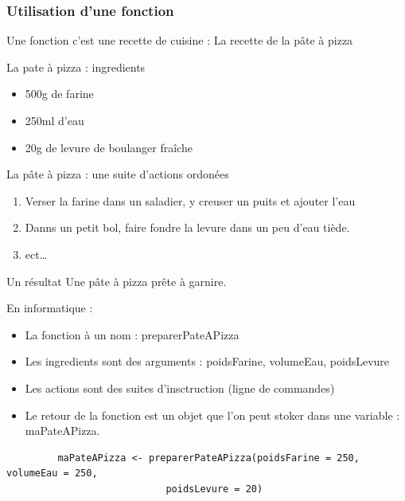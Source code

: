\documentclass[table,svgnames,hyperref={pdfpagemode=FullScreen}]{beamer}
\begin{document}
\begin{frame}
	\frametitle{Utilisation d'une fonction}
	Une fonction c'est une recette de cuisine : La recette de la pâte à pizza
	\begin{exampleblock}{La pate à pizza  : ingredients}
		\begin{itemize}
			\item 500g de farine
			\item 250ml d'eau
			\item 20g de levure de boulanger fraîche
		\end{itemize}
	\end{exampleblock}
\end{frame}
\begin{frame}
	\begin{exampleblock}{La pâte à pizza :  une suite d'actions ordonées}
		\begin{enumerate}
			\item Verser la farine dans un saladier, y creuser un puits et ajouter l'eau
			\item Danns un petit bol, faire fondre la levure dans un peu d'eau tiède.
			\item ect\dots
		\end{enumerate}
			
	\end{exampleblock}
\end{frame}
\begin{frame}
	\begin{exampleblock}{Un résultat}
		Une pâte à pizza prête à garnire.
	\end{exampleblock}
\end{frame}
\begin{frame}[fragile]
	\begin{exampleblock}{En informatique : }
		\begin{itemize}
			\item La fonction à un nom  : preparerPateAPizza
			\item Les ingredients sont des arguments : poidsFarine, volumeEau, poidsLevure
			\item Les actions sont des suites d'insctruction (ligne de commandes)
			\item Le retour de la fonction est un objet que l'on peut stoker dans une variable : maPateAPizza.
		\end{itemize}
		\begin{lstlisting}
		 maPateAPizza <- preparerPateAPizza(poidsFarine = 250, volumeEau = 250, 
							poidsLevure = 20) 
		 \end{lstlisting}
	\end{exampleblock}
	
\end{frame}
\end{document}
